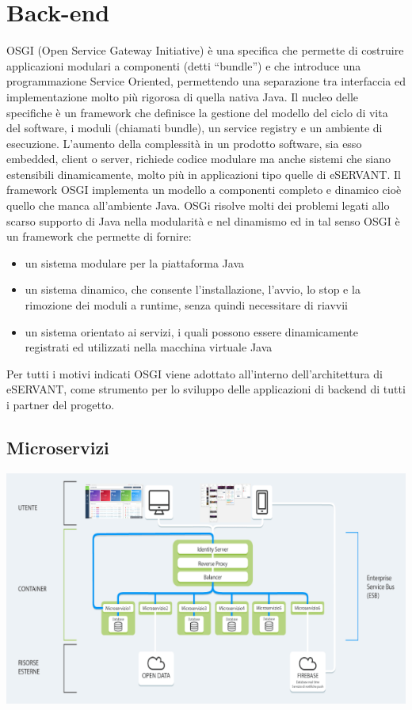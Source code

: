 \section{Back-end}
OSGI (Open Service Gateway Initiative) è una specifica che permette di costruire
applicazioni modulari a componenti (detti “bundle”) e che introduce una
programmazione Service Oriented, permettendo una separazione tra interfaccia ed
implementazione molto più rigorosa di quella nativa Java.
Il nucleo delle specifiche è un framework che definisce la gestione del modello del ciclo di vita del software, i moduli (chiamati bundle), un service registry e un ambiente di esecuzione. 
L’aumento della complessità in un prodotto software, sia esso embedded, client o server, richiede codice modulare ma anche sistemi che siano estensibili dinamicamente, molto più in applicazioni tipo quelle di eSERVANT. Il framework OSGI implementa un modello a componenti completo e dinamico cioè quello che manca all’ambiente Java. 
OSGi risolve molti dei problemi legati allo scarso supporto di Java nella modularità e nel dinamismo ed in tal senso OSGI è un framework che permette di fornire: 
\begin{itemize}
\item un sistema modulare per la piattaforma Java
\item un sistema dinamico, che consente l’installazione, l’avvio, lo stop e la
rimozione dei moduli a runtime, senza quindi necessitare di riavvii
\item un sistema orientato ai servizi, i quali possono essere dinamicamente
registrati ed utilizzati nella macchina virtuale Java
\end{itemize}




Per tutti i motivi indicati OSGI viene adottato all’interno dell’architettura di eSERVANT,
come strumento per lo sviluppo delle applicazioni di backend di tutti i partner del
progetto.

\subsection{Microservizi}
\includegraphics[scale=0.6]{img/cap1/architecture}\\

